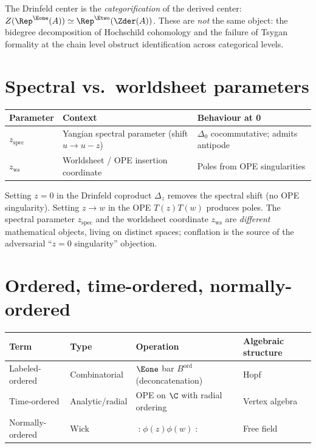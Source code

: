 \noindent
The Drinfeld center is the \emph{categorification} of the derived center:
$Z(\Rep^{\Eone}(A)) \simeq \Rep^{\Etwo}(\Zder(A))$.
These are \emph{not} the same object: the bidegree decomposition of
Hochschild cohomology and the failure of Tsygan formality at the chain
level obstruct identification across categorical levels.

\section{Spectral vs.\ worldsheet parameters}
\label{sec:notation-z}

\begin{center}
\begin{tabular}{@{}lll@{}}
\toprule
\textbf{Parameter} & \textbf{Context} & \textbf{Behaviour at 0} \\
\midrule
$z_{\mathrm{spec}}$ & Yangian spectral parameter (shift $u \to u - z$) &
  $\Delta_0$ cocommutative; admits antipode \\
$z_{\mathrm{ws}}$ & Worldsheet / OPE insertion coordinate &
  Poles from OPE singularities \\
\bottomrule
\end{tabular}
\end{center}

\noindent
Setting $z = 0$ in the Drinfeld coproduct $\Delta_z$ removes the spectral
shift (no OPE singularity).  Setting $z \to w$ in the OPE $T(z)T(w)$ produces
poles.  The spectral parameter $z_{\mathrm{spec}}$ and the worldsheet
coordinate $z_{\mathrm{ws}}$ are \emph{different} mathematical objects,
living on distinct spaces; conflation is the source of the adversarial
``$z=0$ singularity'' objection.

\section{Ordered, time-ordered, normally-ordered}
\label{sec:notation-ordering}

\begin{center}
\begin{tabular}{@{}llll@{}}
\toprule
\textbf{Term} & \textbf{Type} & \textbf{Operation} & \textbf{Algebraic structure} \\
\midrule
Labeled-ordered & Combinatorial & $\Eone$ bar $B^{\mathrm{ord}}$ (deconcatenation) & Hopf \\
Time-ordered & Analytic/radial & OPE on $\C$ with radial ordering & Vertex algebra \\
Normally-ordered & Wick & $\mathopen{:} \phi(z)\phi(w) \mathclose{:}$ & Free field \\
\bottomrule
\end{tabular}
\end{center}

